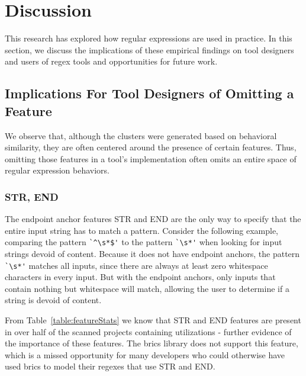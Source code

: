 \section{Discussion}
\label{sec:discussion}

This research has explored how regular expressions are used in practice. In this section, we discuss the implications of these empirical findings on tool designers and users of regex tools and opportunities for future work.



\subsection{Implications For Tool Designers of Omitting a Feature}

We observe that, although the clusters were generated based on behavioral similarity, they are often centered around the presence of certain features. Thus, omitting those features in a tool's implementation often omits an entire space of regular expression behaviors.


\subsubsection{STR, END}
The endpoint anchor features STR and END are the only way to specify that the entire input string has to match a pattern.  Consider the following example, comparing the pattern \verb!`^\s*$'! to the pattern \verb!`\s*'! when looking for input strings devoid of content.  Because it does not have endpoint anchors, the pattern \verb!`\s*'! matches all inputs, since there are always at least zero whitespace characters in every input.  But with the endpoint anchors, only inputs that contain nothing but whitespace will match, allowing the user to determine if a string is devoid of content.

From Table~\ref{table:featureStats} we know that STR and END features are present in over half of the scanned projects containing utilizations - further evidence of the importance of these features.  The brics library does not support this feature, which is a missed opportunity for many developers who could otherwise have used brics to model their regexes that use STR and END.

